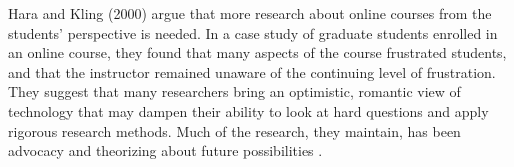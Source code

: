 \documentclass[11pt,a4paper,]{article}
\begin{document}
Hara and Kling (2000) argue that more research about online courses from the students' perspective is needed. In a case study of graduate students enrolled in an online course, they found that many aspects of the course frustrated students, and that the instructor remained unaware of the continuing level of frustration. They suggest that many researchers bring an optimistic, romantic view of technology that may dampen their ability to look at hard questions and apply rigorous research methods. Much of the research, they maintain, has been advocacy and theorizing about future possibilities \autocite{wallace2003online}.

\printbibliography
\end{document}
